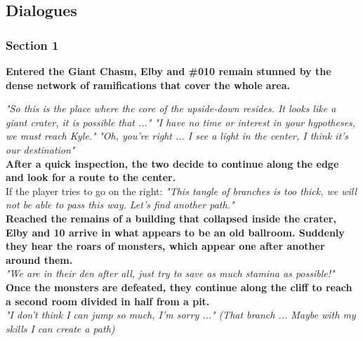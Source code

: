 \subsection{Dialogues}

\subsubsection{Section 1}
\vspace*{0.3cm}

	\textbf{Entered the Giant Chasm, Elby and \#010 remain stunned by the dense network of ramifications that cover the whole area.}

\begin{dialogue}
	
	  \textit{"So this is the place where the core of the upside-down resides. It looks like a giant crater, it is possible that ..."}
	 \textit{"I have no time or interest in your hypotheses, we must reach Kyle."}
	 \textit{"Oh, you're right ... I see a light in the center, I think it's our destination"}\\
	
	\textbf{After a quick inspection, the two decide to continue along the edge and look for a route to the center.}\\
	
	If the player tries to go on the right:
	 \textit{"This tangle of branches is too thick, we will not be able to pass this way. Let's find another path."}\\
	
	\textbf{Reached the remains of a building that collapsed inside the crater, Elby and 10 arrive in what appears to be
an old ballroom. Suddenly they hear the roars of monsters, which appear one after another around them.}\\
	
	
	  \textit{"We are in their den after all, just try to save as much stamina as possible!"}\\
	
	\textbf{Once the monsters are defeated, they continue along the cliff to reach a second room divided in half
from a pit.}\\
	
	 \textit{"I don't think I can jump so much, I'm sorry ..."}
	 \textit{(That branch ... Maybe with my skills I can create a path)}\\
	

\end{dialogue}
